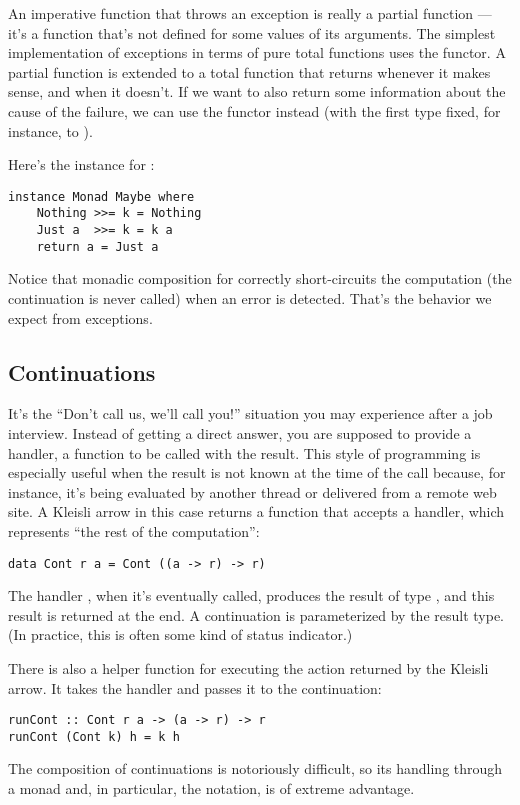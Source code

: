 An imperative function that throws an exception is really a partial
function --- it's a function that's not defined for some values of its
arguments. The simplest implementation of exceptions in terms of pure
total functions uses the  functor. A partial function is
extended to a total function that returns  whenever it
makes sense, and  when it doesn't. If we want to also
return some information about the cause of the failure, we can use the
 functor instead (with the first type fixed, for
instance, to ).

Here's the  instance for :

\begin{Verbatim}
instance Monad Maybe where
    Nothing >>= k = Nothing
    Just a  >>= k = k a
    return a = Just a
\end{Verbatim}
Notice that monadic composition for  correctly
short-circuits the computation (the continuation  is never
called) when an error is detected. That's the behavior we expect from
exceptions.

\subsection{Continuations}

It's the ``Don't call us, we'll call you!'' situation you may experience
after a job interview. Instead of getting a direct answer, you are
supposed to provide a handler, a function to be called with the result.
This style of programming is especially useful when the result is not
known at the time of the call because, for instance, it's being
evaluated by another thread or delivered from a remote web site. A
Kleisli arrow in this case returns a function that accepts a handler,
which represents ``the rest of the computation'':

\begin{Verbatim}
data Cont r a = Cont ((a -> r) -> r)
\end{Verbatim}
The handler , when it's eventually called,
produces the result of type , and this result is returned at
the end. A continuation is parameterized by the result type. (In
practice, this is often some kind of status indicator.)

There is also a helper function for executing the action returned by the
Kleisli arrow. It takes the handler and passes it to the continuation:

\begin{Verbatim}
runCont :: Cont r a -> (a -> r) -> r
runCont (Cont k) h = k h
\end{Verbatim}
The composition of continuations is notoriously difficult, so its
handling through a monad and, in particular, the  notation,
is of extreme advantage.


